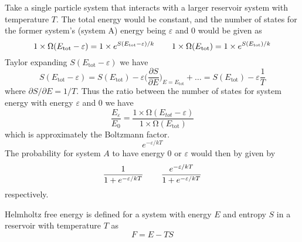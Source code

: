 \begin{defi}
Take a single particle system that interacts with a larger reservoir system with temperature $T$. The total energy would be constant, and the number of states for the former system's (system A) energy being $\varepsilon  $ and 0 would be given as
\[1\times \mathrm{\Omega} (E_{\mathrm{tot}}-\varepsilon )=1\times e^{S(E_{\mathrm{tot}}-\varepsilon )/k}\hspace{5ex}1\times \mathrm{\Omega} (E_{\mathrm{tot}})=1\times e^{S(E_{\mathrm{tot}})/k}\]
Taylor expanding $S(E_{\mathrm{tot}}-\varepsilon )$ we have
\[S(E_{\mathrm{tot}}-\varepsilon )=S(E_{\mathrm{tot}})-\varepsilon \Big(\dfrac{\partial S}{\partial E} \Big)_{E=E_{\mathrm{tot}}}+\ldots=S(E_{\mathrm{tot}})-\varepsilon \dfrac{1}{T} \]
where $\partial S/\partial E=1/T$. Thus the ratio between the number of states for system energy with energy $\varepsilon $ and $0$ we have
\[\dfrac{E_{\varepsilon }}{E_{0}}=\dfrac{1\times \mathrm{\Omega} (E_{tot}-\varepsilon )}{1\times \mathrm{\Omega} (E_{\mathrm{tot}})}\]
which is approximately the Boltzmann factor.
\[e^{-\varepsilon /kT}\]
The probability for system $A$ to have energy 0 or $\varepsilon $ would then by given by 
\[\dfrac{1}{1+e^{-\varepsilon /kT}}\hspace{5ex}\dfrac{e^{-\varepsilon /kT}}{1+e^{-\varepsilon /kT}}\]
respectively.
\end{defi}
\vspace{2ex}
\begin{defi}
Helmholtz free energy is defined for a system with energy $E$ and entropy $S$ in a reservoir with temperature $T$ as
\[F=E-TS\]

\end{defi}
\vspace{2ex}

